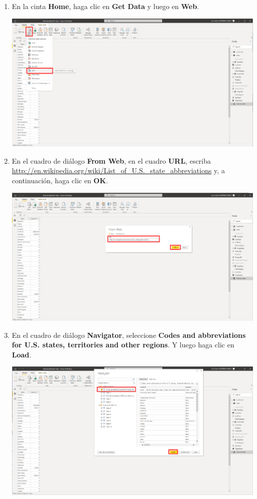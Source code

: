 \documentclass[12pt,letterpaper]{article}
\newcommand\tab[1][1cm]{\hspace*{#1}}
\begin{document}
\begin{enumerate}[\tab 1.]
\begin{center}
        \end{center}
        \item En la cinta \textbf{Home}, haga clic en \textbf{Get Data} y luego en \textbf{Web}.
        \begin{center}
            \includegraphics[width=13cm]{./img/img53.png}
        \end{center}
        \item En el cuadro de diálogo \textbf{From Web}, en el cuadro \textbf{URL}, escriba \url{http://en.wikipedia.org/wiki/List_of_U.S._state_abbreviations} y, a continuación, haga clic en \textbf{OK}.
        \begin{center}
            \includegraphics[width=13cm]{./img/img54.png}
        \end{center}
        \item En el cuadro de diálogo \textbf{Navigator}, seleccione \textbf{Codes and abbreviations for U.S. states, territories and other regions}. Y luego haga clic en \textbf{Load}.
        \begin{center}
            \includegraphics[width=13cm]{./img/img55.png}

\end{center}
\end{enumerate}
\end{document}

